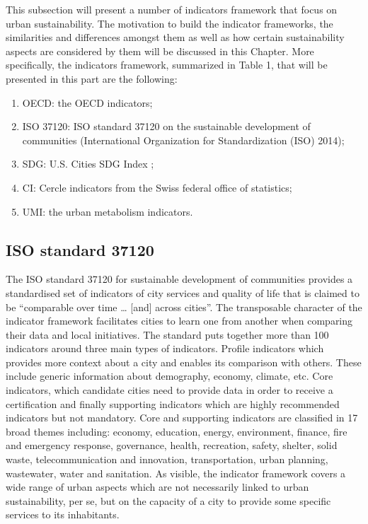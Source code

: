 \documentclass[preprint,12pt]{elsarticle}
\begin{document}
This subsection will present a number of indicators framework that focus on urban sustainability. The motivation to build the indicator frameworks, the similarities and differences amongst them as well as how certain sustainability aspects are considered by them will be discussed in this Chapter. More specifically, the indicators framework, summarized in Table 1, that will be presented in this part are the following:
\begin{enumerate}
\item OECD: the OECD indicators;
\item ISO 37120: ISO standard 37120 on the sustainable development of communities (International Organization for Standardization (ISO) 2014);
\item SDG: U.S. Cities SDG Index \cite{prakash2017us};
\item CI: Cercle indicators from the Swiss federal office of statistics;
\item UMI: the urban metabolism indicators.
\end{enumerate}



\subsection{ISO standard 37120}
The ISO standard 37120 for sustainable development of communities provides a standardised set of indicators of city services and quality of life that is claimed to be “comparable over time … [and] across cities”. The transposable character of the indicator framework facilitates cities to learn one from another when comparing their data and local initiatives. The standard puts together more than 100 indicators around three main types of indicators. Profile indicators which provides more context about a city and enables its comparison with others. These include generic information about demography, economy, climate, etc. Core indicators, which candidate cities need to provide data in order to receive a certification and finally supporting indicators which are highly recommended indicators but not mandatory. Core and supporting indicators are classified in 17 broad themes including: economy, education, energy, environment, finance, fire and emergency response, governance, health, recreation, safety, shelter, solid waste, telecommunication and innovation, transportation, urban planning, wastewater, water and sanitation. As visible, the indicator framework covers a wide range of urban aspects which are not necessarily linked to urban sustainability, per se, but on the capacity of a city to provide some specific services to its inhabitants.
\end{document}
